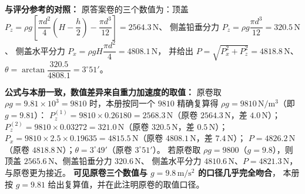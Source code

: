 \begin{tishi}
\textbf{与评分参考的对照：}
原答案卷的三个数值为：顶盖
$P_z=\rho g\left[\dfrac{\pi d^{2}}{4}\left(H-\dfrac{h}{2}\right)-\dfrac{\pi d^{3}}{12}\right]=2564.3\,\mathrm{N}$、
侧盖铅垂分力 $P_z=\rho g\dfrac{\pi d^{3}}{12}=320.5\,\mathrm{N}$、
侧盖水平分力 $P_x=\rho gH\dfrac{\pi d^{2}}{4}=4808.1\,\mathrm{N}$，
并给出 $P=\sqrt{P_x^{2}+P_z^{2}}=4818.8\,\mathrm{N}$、$\theta=\arctan\dfrac{320.5}{4808.1}=3^{\circ}51'$。

\textbf{公式与本册一致，数值差异来自重力加速度的取值：}
原卷取 $\rho g=9.81\times10^{3}=9810$ 时，本册按同一个 $9810$ 精确复算得
$\rho g=9810\,\mathrm{N/m^{3}}$（即 $g=9.81$）：
$P_z^{(1)}=9810\times0.26180=2568.3\,\mathrm{N}$（原卷 $2564.3\,\mathrm{N}$，差 $4.0\,\mathrm{N}$）；
$P_z^{(2)}=9810\times0.03272=321.0\,\mathrm{N}$（原卷 $320.5\,\mathrm{N}$，差 $0.5\,\mathrm{N}$）；
$P_x=9810\times2.5\times0.19635=4815.5\,\mathrm{N}$（原卷 $4808.1\,\mathrm{N}$，差 $7.4\,\mathrm{N}$）；
$P=4826.2\,\mathrm{N}$（原卷 $4818.8\,\mathrm{N}$）；$\theta=3^{\circ}49'$（原卷 $3^{\circ}51'$）。
若原卷取 $\rho g=9800$（$g=9.8$），则顶盖 $2565.6\,\mathrm{N}$、侧盖铅垂分力 $320.6\,\mathrm{N}$、
侧盖水平分力 $4810.6\,\mathrm{N}$、$P=4821.3\,\mathrm{N}$，与原卷更为接近。
\textbf{可见原卷三个数值与 $g=9.8\,\mathrm{m/s^{2}}$ 的口径几乎完全吻合}，
本册按 $g=9.81$ 给出复算值，并在此注明原卷的取值口径。
\end{tishi}


